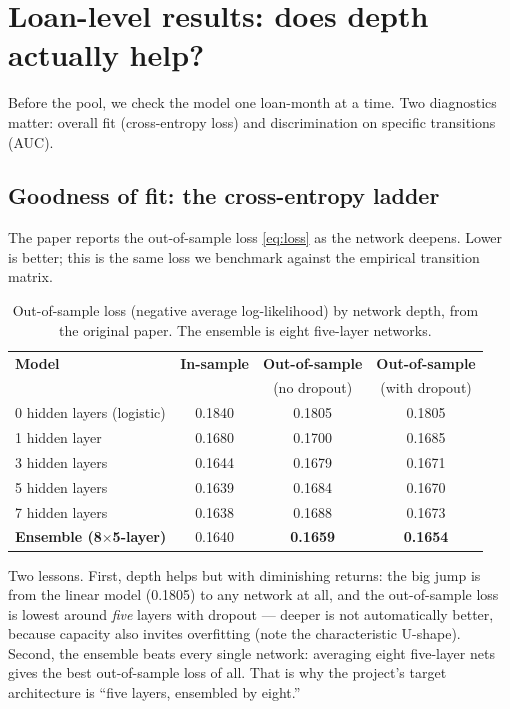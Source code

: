 \documentclass[11pt]{article}
\begin{document}
\section{Loan-level results: does depth actually help?}
\label{sec:loanresults}

Before the pool, we check the model one loan-month at a time. Two diagnostics matter: overall
fit (cross-entropy loss) and discrimination on specific transitions (AUC).

\subsection{Goodness of fit: the cross-entropy ladder}

The paper reports the out-of-sample loss \eqref{eq:loss} as the network deepens. Lower is
better; this is the same loss we benchmark against the empirical transition matrix.

\begin{table}[H]
\centering
\caption{Out-of-sample loss (negative average log-likelihood) by network depth, from the
original paper. The ensemble is eight five-layer networks.}
\vspace{2pt}
\begin{tabular}{lccc}
\toprule
\textbf{Model} & \textbf{In-sample} & \textbf{Out-of-sample} & \textbf{Out-of-sample} \\
               &                    & (no dropout)           & (with dropout) \\
\midrule
0 hidden layers (logistic) & 0.1840 & 0.1805 & 0.1805 \\
1 hidden layer             & 0.1680 & 0.1700 & 0.1685 \\
3 hidden layers            & 0.1644 & 0.1679 & 0.1671 \\
5 hidden layers            & 0.1639 & 0.1684 & 0.1670 \\
7 hidden layers            & 0.1638 & 0.1688 & 0.1673 \\
\textbf{Ensemble (8$\times$5-layer)} & 0.1640 & \textbf{0.1659} & \textbf{0.1654} \\
\bottomrule
\end{tabular}
\end{table}

\begin{intuition}
Two lessons. First, depth helps but with diminishing returns: the big jump is from the
linear model (0.1805) to any network at all, and the out-of-sample loss is lowest around
\emph{five} layers with dropout --- deeper is not automatically better, because capacity
also invites overfitting (note the characteristic U-shape). Second, the ensemble beats every
single network: averaging eight five-layer nets gives the best out-of-sample loss of all.
That is why the project's target architecture is ``five layers, ensembled by eight.''
\end{intuition}
\end{document}
